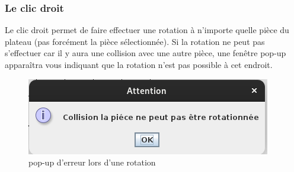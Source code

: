 \documentclass[a4paper,12pt]{article} %
\begin{document}
\subsubsection{Le clic droit}
Le clic droit permet de faire effectuer une rotation à n'importe quelle pièce du plateau (pas forcément la pièce sélectionnée). Si la rotation ne peut pas s'effectuer car il y aura une collision avec une autre pièce, une fenêtre pop-up apparaîtra vous indiquant que la rotation n'est pas possible à cet endroit.

\begin{figure}[ht]
    \centering
    \includegraphics[width=0.5\linewidth]{images/erreurCollision.png}
    \caption{pop-up d'erreur lors d'une rotation}
\end{figure}
\end{document}

